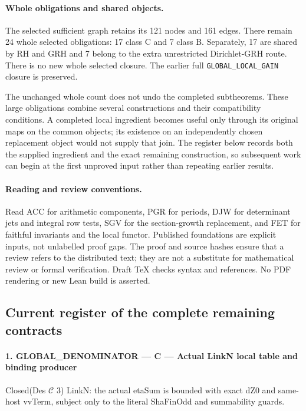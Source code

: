 \paragraph{Whole obligations and shared objects.}
The selected sufficient graph retains its 121 nodes and 161 edges.
There remain 24 whole selected obligations: 17 class C and 7
class B.  Separately, 17 are shared by RH and GRH and 7
belong to the extra unrestricted Dirichlet-GRH route.  There is no new
whole selected closure.  The earlier full
\texttt{GLOBAL\_\allowbreak LOCAL\_\allowbreak GAIN} closure is preserved.

The unchanged whole count does not undo the completed subtheorems.
These large obligations combine several constructions and their
compatibility conditions.  A completed local ingredient becomes useful
only through its original maps on the common objects; its existence on
an independently chosen replacement object would not supply that join.
The register below records both the supplied ingredient and the exact
remaining construction, so subsequent work can begin at the first
unproved input rather than repeating earlier results.

\paragraph{Reading and review conventions.}
Read ACC for arithmetic components, PGR for periods, DJW for determinant
jets and integral row tests, SGV for the section-growth replacement,
and FET for faithful invariants and the local functor.  Published
foundations are explicit inputs, not unlabelled proof gaps.  The proof
and source hashes ensure that a review refers to the distributed text;
they are not a substitute for mathematical review or formal verification.
Draft TeX checks syntax and references.  No PDF rendering or new Lean
build is asserted.

\subsection{Current register of the complete remaining contracts}

\paragraph{1. GLOBAL\_\allowbreak DENOMINATOR — C — Actual LinkN local table and binding producer}

Closed(Des $\mathcal C$ 3) LinkN: the actual etaSum is bounded with exact dZ0 and same-host vvTerm, subject only to the literal ShaFinOdd and summability guards.

